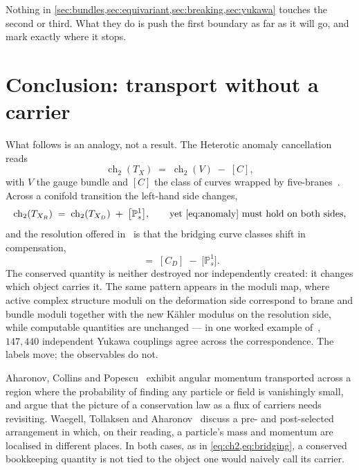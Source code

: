 \documentclass[11pt,a4paper]{article}
\newcommand{\PP}{\mathbb{P}}
\newcommand{\ch}{\operatorname{ch}}
\newcommand{\XD}{X_D}
\newcommand{\XR}{X_R}
\theoremstyle{definition}
\begin{document}
\noindent
Nothing in \cref{sec:bundles,sec:equivariant,sec:breaking,sec:yukawa} touches
the second or third. What they do is push the first boundary as far as it will
go, and mark exactly where it stops.


\section{Conclusion: transport without a carrier}
\label{sec:aside}
What follows is an analogy, not a result.  The Heterotic anomaly cancellation reads
%
\begin{equation}
\ch_2(T_X) \;=\; \ch_2(V) \;-\; [C],
\label{eq:anomaly}
\end{equation}
%
with $V$ the gauge bundle and $[C]$ the class of curves wrapped by
five-branes~\cite{Anderson2025,Anderson2023branes}. Across a conifold
transition the left-hand side changes,
%
\begin{equation}
\ch_2(T_{\XR}) \;=\; \ch_2(T_{\XD}) \;+\; \bigl[\PP^1_s\bigr],
\qquad\text{yet \cref{eq:anomaly} must hold on both sides,}
\label{eq:ch2}
\end{equation}
%
and the resolution offered in~\cite{Anderson2025} is that the bridging curve
classes shift in compensation,
%
\begin{equation}
[C_R] \;=\; [C_D] \;-\; \bigl[\PP^1_s\bigr].
\label{eq:bridging}
\end{equation}
%
The conserved quantity is neither destroyed nor independently created: it changes
which object carries it. The same pattern appears in the moduli map, where
active complex structure moduli on the deformation side correspond to brane
and bundle moduli together with the new K\"ahler modulus on the resolution
side, while computable quantities are unchanged --- in one worked example
of~\cite{Anderson2025}, $147{,}440$ independent Yukawa couplings agree across
the correspondence. The labels move; the observables do not.

Aharonov, Collins and Popescu~\cite{Aharonov2023} exhibit angular momentum
transported across a region where the probability of finding any particle or
field is vanishingly small, and argue that the picture of a conservation law
as a flux of carriers needs revisiting. Waegell, Tollaksen and
Aharonov~\cite{Waegell2024} discuss a pre- and post-selected arrangement in
which, on their reading, a particle's mass and momentum are localised in
different places. In both cases, as in \cref{eq:ch2,eq:bridging}, a conserved
bookkeeping quantity is not tied to the object one would naively call its
carrier.
\end{document}
